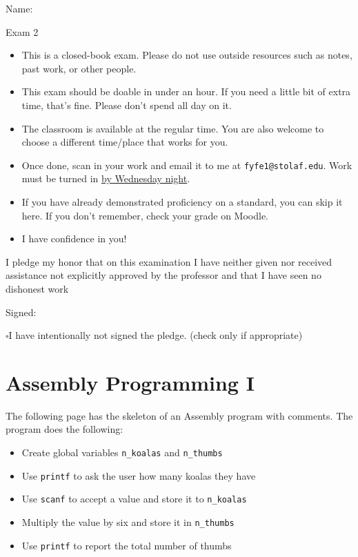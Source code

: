 \documentclass[12pt]{article}
\begin{document}
Name: \makebox[3in]{\hrulefill
\hrulefill}

\vfill

\begin{center}
{\huge Exam 2}
\end{center}

\begin{itemize}
    \item This is a closed-book exam. Please do not use outside resources such as notes, past work, or other people. 
    \item This exam should be doable in under an hour. If you need a little bit of extra time, that's fine. Please don't spend all day on it. 
    \item The classroom is available at the regular time. You are also welcome to choose a different time/place that works for you. 
    \item Once done, scan in your work and email it to me at \texttt{fyfe1@stolaf.edu}. Work must be turned in \underline{by Wednesday night}.
    \item If you have already demonstrated proficiency on a standard, you can skip it here. If you don't remember, check your grade on Moodle.
    \item I have confidence in you!
\end{itemize}

\vfill

I pledge my honor that on this examination I have neither given nor received assistance not explicitly approved by the professor and that I have seen no dishonest work 

\hfill Signed: \makebox[3in]{\hrulefill}

$\square$\quad I have intentionally not signed the pledge. (check only if appropriate)
\newpage

\section*{Assembly Programming I}


The following page has the skeleton of an Assembly program with comments. The program does the following:
\begin{itemize}
    \item Create global variables \texttt{n\_koalas} and \texttt{n\_thumbs}
    \item Use \texttt{printf} to ask the user how many koalas they have
    \item Use \texttt{scanf} to accept a value and store it to \texttt{n\_koalas}
    \item Multiply the value by six and store it in \texttt{n\_thumbs}
    \item Use \texttt{printf} to report the total number of thumbs
\end{itemize}
\end{document}

